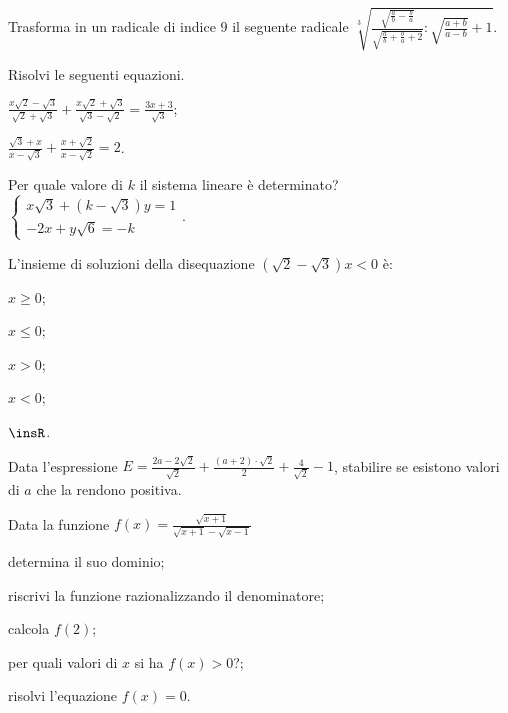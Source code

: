 \begin{esercizio}%
Trasforma in un radicale di indice $9$ il seguente radicale $\sqrt[3]{\frac{\sqrt{\frac a b-\frac b a}}{\sqrt{\frac a b+\frac b a+2}}:\sqrt{\frac{a+b}{a-b}}+1}$.
\end{esercizio}

\begin{esercizio}[\Ast]%
Risolvi le seguenti equazioni.
\begin{multicols}{2}
 \begin{enumeratea}
 \item $\frac{x\sqrt 2-\sqrt 3}{\sqrt 2+\sqrt 3}+\frac{x\sqrt 2+\sqrt 3}{\sqrt 3-\sqrt 2}=\frac{3x+3}{\sqrt 3}$;
 \item $\frac{\sqrt 3+x}{x-\sqrt 3}+\frac{x+\sqrt 2}{x-\sqrt 2}=2$.
 \end{enumeratea}
\end{multicols}
\end{esercizio}

\begin{esercizio}%
Per quale valore di $k$ il sistema lineare è determinato?
$\left\{\begin{array}{l}{x\sqrt 3+(k-\sqrt 3)y=1}\\
 {-2x+y\sqrt 6=-k} \end{array}\right..$
\end{esercizio}

\begin{esercizio}%
L’insieme di soluzioni della disequazione $(\sqrt 2-\sqrt 3)x<0$ è:
\begin{multicols}{5}
 \begin{enumeratea}
 \item $x\ge 0$;
 \item $x\le 0$;
 \item $x>0$;
 \item $x<0$;
 \item $\insR$.
 \end{enumeratea}
\end{multicols}
\end{esercizio}

\begin{esercizio}%
Data l'espressione $E=\frac{2a-2\sqrt 2}{\sqrt 2}+\frac{(a+2)\cdot \sqrt 2} 2+\frac 4{\sqrt 2}-1$, stabilire se esistono valori di $a$ che la rendono positiva.
\end{esercizio}

\begin{esercizio}%
Data la funzione $f(x)=\frac{\sqrt{x+1}}{\sqrt{x+1}-\sqrt{x-1}}$
 \begin{enumeratea}
 \item determina il suo dominio;
 \item riscrivi la funzione razionalizzando il denominatore;
 \item calcola $f(2)$;
 \item per quali valori di $x$ si ha $f(x)>0$?;
 \item risolvi l'equazione $f(x)=0$.
 \end{enumeratea}
\end{esercizio}


